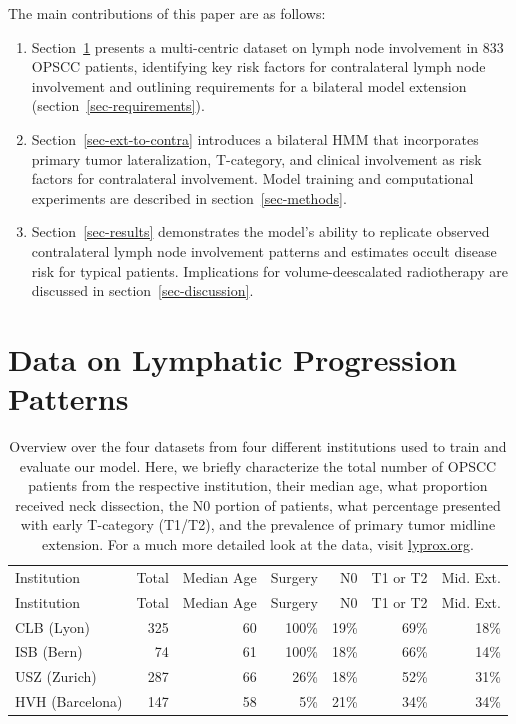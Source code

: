 \documentclass[
  sn-mathphys-num,
]{sn-jnl}
\begin{document}
The main contributions of this paper are as follows:

\begin{enumerate}
\def\labelenumi{\arabic{enumi}.}
\item
  Section~\ref{sec-data} presents a multi-centric dataset on lymph node
  involvement in 833 OPSCC patients, identifying key risk factors for
  contralateral lymph node involvement and outlining requirements for a
  bilateral model extension (section~\ref{sec-requirements}).
\item
  Section~\ref{sec-ext-to-contra} introduces a bilateral HMM that
  incorporates primary tumor lateralization, T-category, and clinical
  involvement as risk factors for contralateral involvement. Model
  training and computational experiments are described in
  section~\ref{sec-methods}.
\item
  Section~\ref{sec-results} demonstrates the model's ability to
  replicate observed contralateral lymph node involvement patterns and
  estimates occult disease risk for typical patients. Implications for
  volume-deescalated radiotherapy are discussed in
  section~\ref{sec-discussion}.
\end{enumerate}

\section{Data on Lymphatic Progression Patterns}\label{sec-data}

{
\setlength{\tabcolsep}{6pt}
\begin{longtable}[]{@{}lrrrrrr@{}}

\caption{\label{tbl-data-overview}Overview over the four datasets from
four different institutions used to train and evaluate our model. Here,
we briefly characterize the total number of OPSCC patients from the
respective institution, their median age, what proportion received neck
dissection, the N0 portion of patients, what percentage presented with
early T-category (T1/T2), and the prevalence of primary tumor midline
extension. For a much more detailed look at the data, visit
\href{https://lyprox.org}{lyprox.org}.}

\tabularnewline

\tabularnewline
\toprule\noalign{}
Institution & Total & Median Age & Surgery & N0 & T1 or T2
& Mid. Ext. \\
\midrule\noalign{}
\endfirsthead
\toprule\noalign{}
Institution & Total & Median Age & Surgery & N0 & T1 or T2
& Mid. Ext. \\
\midrule\noalign{}
\endhead
\bottomrule\noalign{}
\endlastfoot
CLB (Lyon) & 325 & 60 & 100\% & 19\% & 69\% & 18\% \\
ISB (Bern) & 74 & 61 & 100\% & 18\% & 66\% & 14\% \\
USZ (Zurich) & 287 & 66 & 26\% & 18\% & 52\% & 31\% \\
HVH (Barcelona) & 147 & 58 & 5\% & 21\%
& 34\% & 34\% \\

\end{longtable}
}
\end{document}

